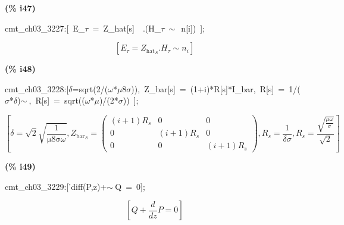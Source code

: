 \documentclass[fleqn]{article}
\begin{document}
\noindent
\begin{minipage}[t]{4.000000em}\color{red}\bfseries
(\% i47)	
\end{minipage}
\begin{minipage}[t]{\textwidth}\color{blue}
cmt\_ch03\_3227:[\ E\_\ensuremath{\tau}\ =\ Z\_hat[s]\ \ .(H\_\ensuremath{\tau}\ \ensuremath{\sim\ }\ n[i])\ ];
\end{minipage}
\[\displaystyle \tag{cmt\_ ch03\_ 3227} 
\left[ {E_{\tau }}={{{Z_{\ensuremath{\mathrm{hat}}}}}_s}\ensuremath{\mathrm{ . }}{H_{\tau }}\operatorname{\sim  }{n_i}\right] \mbox{}
\]


\noindent
\begin{minipage}[t]{4.000000em}\color{red}\bfseries
(\% i48)	
\end{minipage}
\begin{minipage}[t]{\textwidth}\color{blue}
cmt\_ch03\_3228:[\ensuremath{\delta}=sqrt(2/(\ensuremath{\omega}*\ensuremath{\mu}8\ensuremath{\sigma})),\ Z\_bar[s]\ =\ (1+i)*R[s]*I\_bar,\ R[s]\ =\ 1/(\ensuremath{\sigma}*\ensuremath{\delta})\ensuremath{\sim\ },\ R[s]\ =\ sqrt((\ensuremath{\omega}*\ensuremath{\mu})/(2*\ensuremath{\sigma}))\ ];
\end{minipage}
\[\displaystyle \tag{cmt\_ ch03\_ 3228} 
\left[ \delta =\sqrt{2} \sqrt{\frac{1}{\ensuremath{\mathrm{\mu 8\sigma }} \omega }}\operatorname{,}{{{Z_{\ensuremath{\mathrm{bar}}}}}_s}=\begin{pmatrix}\left( i+1\right)  {R_s} & 0 & 0\\
0 & \left( i+1\right)  {R_s} & 0\\
0 & 0 & \left( i+1\right)  {R_s}\end{pmatrix}\operatorname{,}{R_s}=\frac{1}{\delta  \sigma }\operatorname{,}{R_s}=\frac{\sqrt{\frac{\mu  \omega }{\sigma }}}{\sqrt{2}}\right] \mbox{}
\]


\noindent
\begin{minipage}[t]{4.000000em}\color{red}\bfseries
(\% i49)	
\end{minipage}
\begin{minipage}[t]{\textwidth}\color{blue}
cmt\_ch03\_3229:['diff(P,z)+\ensuremath{\sim\ }Q\ =\ 0];
\end{minipage}
\[\displaystyle \tag{cmt\_ ch03\_ 3229} 
\left[ Q+\frac{d}{d z} P=0\right] \mbox{}
\]
\end{document}
